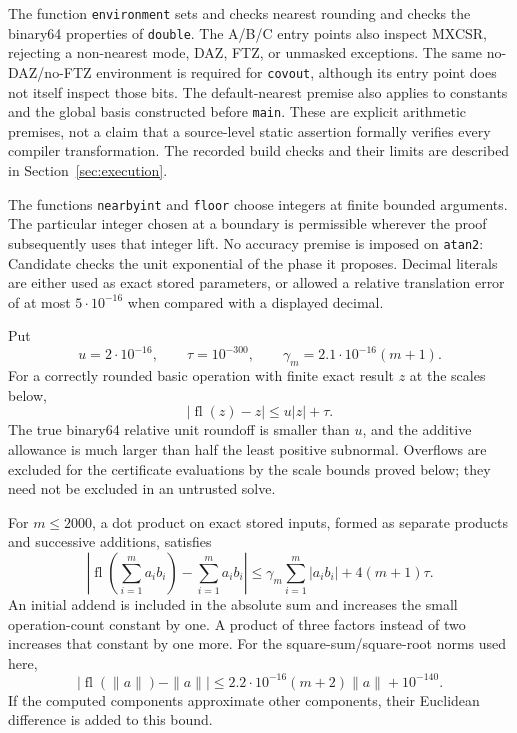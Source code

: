 The function \texttt{environment} sets and checks nearest rounding and
checks the binary64 properties of \texttt{double}.  The A/B/C entry points
also inspect MXCSR, rejecting a non-nearest mode, DAZ, FTZ, or unmasked
exceptions.  The same no-DAZ/no-FTZ environment is required for
\texttt{covout}, although its entry point does not itself inspect those
bits.  The default-nearest premise also applies to constants and the
global basis constructed before \texttt{main}.  These are explicit
arithmetic premises, not a claim that a source-level static assertion
formally verifies every compiler transformation.  The recorded build
checks and their limits are described in Section~\ref{sec:execution}.

The functions \texttt{nearbyint} and \texttt{floor} choose integers at
finite bounded arguments.  The particular integer chosen at a boundary
is permissible wherever the proof subsequently uses that integer lift.
No accuracy premise is imposed on \texttt{atan2}: Candidate checks the
unit exponential of the phase it proposes.  Decimal literals are either
used as exact stored parameters, or allowed a relative translation error
of at most $5\cdot10^{-16}$ when compared with a displayed decimal.

Put
\begin{equation}\label{round:unit}
 u=2\cdot10^{-16},\qquad \tau=10^{-300},\qquad
 \gamma_m=2.1\cdot10^{-16}(m+1).
\end{equation}
For a correctly rounded basic operation with finite exact result $z$ at
the scales below,
\begin{equation}\label{round:basic}
 |\operatorname{fl}(z)-z|\le u|z|+\tau.
\end{equation}
The true binary64 relative unit roundoff is smaller than $u$, and the
additive allowance is much larger than half the least positive
subnormal.  Overflows are excluded for the certificate evaluations by
the scale bounds proved below; they need not be excluded in an
untrusted solve.

\begin{lemma}\label{round:accumulation}
For $m\le2000$, a dot product on exact stored inputs, formed as separate
products and successive additions, satisfies
\begin{equation}\label{round:dot}
 \left|\operatorname{fl}\!\left(\sum_{i=1}^m a_i b_i\right)
                  -\sum_{i=1}^m a_i b_i\right|
 \le \gamma_m\sum_{i=1}^m|a_i b_i|+4(m+1)\tau.
\end{equation}
An initial addend is included in the absolute sum and increases the
small operation-count constant by one.  A product of three factors
instead of two increases that constant by one more.
For the square-sum/square-root norms used here,
\begin{equation}\label{round:norm}
 \left|\operatorname{fl}(\|a\|)-\|a\|\right|
 \le 2.2\cdot10^{-16}(m+2)\|a\|+10^{-140}.
\end{equation}
If the computed components approximate other components, their
Euclidean difference is added to this bound.
\end{lemma}

